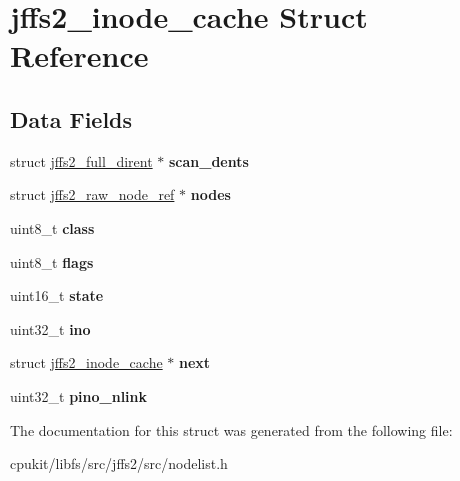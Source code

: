 \hypertarget{structjffs2__inode__cache}{}\section{jffs2\+\_\+inode\+\_\+cache Struct Reference}
\label{structjffs2__inode__cache}
\subsection*{Data Fields}
\begin{DoxyCompactItemize}
\item 
\mbox{\label{structjffs2__inode__cache_a1f03ffe51e9ae59f7370368a1138bb36}} 
struct \mbox{\hyperlink{structjffs2__full__dirent}{jffs2\+\_\+full\+\_\+dirent}} $\ast$ {\bfseries scan\+\_\+dents}
\item 
\mbox{\label{structjffs2__inode__cache_a0c3bf3e498e6ebf8d1e8e1bdc922749b}} 
struct \mbox{\hyperlink{structjffs2__raw__node__ref}{jffs2\+\_\+raw\+\_\+node\+\_\+ref}} $\ast$ {\bfseries nodes}
\item 
\mbox{\label{structjffs2__inode__cache_a42ab00feaf11f06507d6f442f5985540}} 
uint8\+\_\+t {\bfseries class}
\item 
\mbox{\label{structjffs2__inode__cache_a975597f5bcd95dd3ae05d84d64668473}} 
uint8\+\_\+t {\bfseries flags}
\item 
\mbox{\label{structjffs2__inode__cache_aec54cbcb9b01fcf8c43a1e491d612923}} 
uint16\+\_\+t {\bfseries state}
\item 
\mbox{\label{structjffs2__inode__cache_aa0cf1a65e5d70b45be59c29ed5130a0b}} 
uint32\+\_\+t {\bfseries ino}
\item 
\mbox{\label{structjffs2__inode__cache_a3019a0e07ca710646f67ae2a5b4e0ba5}} 
struct \mbox{\hyperlink{structjffs2__inode__cache}{jffs2\+\_\+inode\+\_\+cache}} $\ast$ {\bfseries next}
\item 
\mbox{\label{structjffs2__inode__cache_a463fc34064e532c402eb35229c734b47}} 
uint32\+\_\+t {\bfseries pino\+\_\+nlink}
\end{DoxyCompactItemize}


The documentation for this struct was generated from the following file\+:\begin{DoxyCompactItemize}
\item 
cpukit/libfs/src/jffs2/src/nodelist.\+h\end{DoxyCompactItemize}
